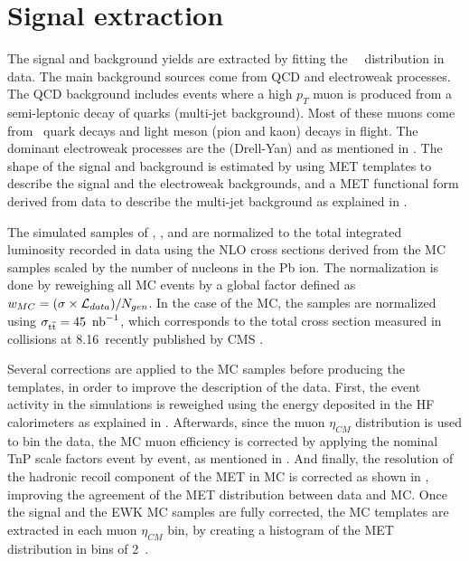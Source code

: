 
\section{Signal extraction}\label{sec:WBoson_SignalExtraction}

The signal and background yields are extracted by fitting the \ETslash\ \ distribution in data. The main background sources come from QCD and electroweak processes. The QCD background includes events where a high $p_{T}$ muon is produced from a semi-leptonic decay of quarks (multi-jet background). Most of these muons come from \PQb\ quark decays and light meson (pion and kaon) decays in flight. The dominant electroweak processes are the \DYToMuMu (Drell-Yan) and \WToTauNu as mentioned in . The shape of the signal and background is estimated by using MET templates to describe the signal and the electroweak backgrounds, and a MET functional form derived from data to describe the multi-jet background as explained in .

The simulated samples of \DYToMuMu , \DYToTauTau , \WToMuNu and \WToTauNu are normalized to the total integrated luminosity recorded in data using the NLO cross sections derived from the \POWHEG MC samples scaled by the number of nucleons in the Pb ion. The normalization is done by reweighing all MC events by a global factor defined as $w_{MC} = (\sigma\times\mathcal{L}_{data})/N_{gen}$. In the case of the \ttbar MC, the samples are normalized using $\sigma_{\text{t}\overline{\text{t}}} = 45~\mbox{\ensuremath{\,\text{nb}^\text{$-$1}}}$, which corresponds to the total cross section measured in \pPb collisions at 8.16~\TeV recently published by CMS \cite{HIN-17-002}.

Several corrections are applied to the MC samples before producing the templates, in order to improve the description of the data. First, the event activity in the simulations is reweighed using the energy deposited in the HF calorimeters as explained in . Afterwards, since the muon $\eta_{CM}$ distribution is used to bin the data, the MC muon efficiency is corrected by applying the nominal TnP scale factors event by event, as mentioned in . And finally, the resolution of the hadronic recoil component of the MET in MC is corrected as shown in , improving the agreement of the MET distribution between data and MC. Once the signal and the EWK MC samples are fully corrected, the MC templates are extracted in each muon $\eta_{CM}$ bin, by creating a histogram of the MET distribution in bins of 2~\GeVc.


